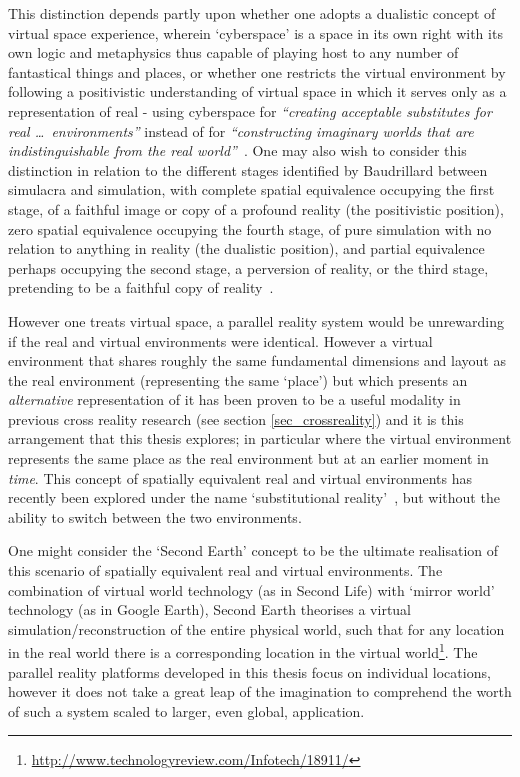 This distinction depends partly upon whether one adopts a dualistic concept of virtual space experience, wherein `cyberspace' is a space in its own right with its own logic and metaphysics thus capable of playing host to any number of fantastical things and places, or whether one restricts the virtual environment by following a positivistic understanding of virtual space in which it serves only as a representation of real - using cyberspace for \textit{``creating acceptable substitutes for real \ldots\ environments''} instead of for \textit{``constructing imaginary worlds that are indistinguishable from the real world''}~\cite{Qvortrup2002}. One may also wish to consider this distinction in relation to the different stages identified by Baudrillard between simulacra and simulation, with complete spatial equivalence occupying the first stage, of a faithful image or copy of a profound reality (the positivistic position), zero spatial equivalence occupying the fourth stage, of pure simulation with no relation to anything in reality (the dualistic position), and partial equivalence perhaps occupying the second stage, a perversion of reality, or the third stage, pretending to be a faithful copy of reality~\cite{Baudrillard1994}.


However one treats virtual space, a parallel reality system would be unrewarding if the real and virtual environments were identical\turklevrfootnote{}. However a virtual environment that shares roughly the same fundamental dimensions and layout as the real environment (representing the same `place') but which presents an \textit{alternative} representation of it has been proven to be a useful modality in previous cross reality research (see section \ref{sec_crossreality}) and it is this arrangement that this thesis explores; in particular where the virtual environment represents the same place as the real environment but at an earlier moment in \textit{time}. This concept of spatially equivalent real and virtual environments has recently been explored under the name `substitutional reality'~\cite{Simeone2015}, but without the ability to switch between the two environments.

One might consider the `Second Earth' concept to be the ultimate realisation of this scenario of spatially equivalent real and virtual environments. The combination of virtual world technology (as in Second Life) with `mirror world' technology (as in Google Earth), Second Earth theorises a virtual simulation/reconstruction of the entire physical world, such that for any location in the real world there is a corresponding location in the virtual world\footnote{\url{http://www.technologyreview.com/Infotech/18911/}}. The parallel reality platforms developed in this thesis focus on individual locations, however it does not take a great leap of the imagination to comprehend the worth of such a system scaled to larger, even global, application.

